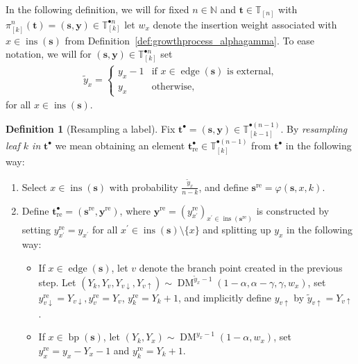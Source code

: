 \documentclass[a4paper, final]{amsart}
\theoremstyle{plain}
\theoremstyle{definition}
\newtheorem{defi}[thm]{Definition}
\newcommand{\tree}[1][t]{\boldsymbol{#1}}
\newcommand{\T}{\mathbb{T}}
\DeclareMathOperator{\edge}{edge}
\DeclareMathOperator{\insertable}{ins}
\DeclareMathOperator{\branchpoints}{bp}
\newcommand{\insertablef}[1][\tree]{\insertable({\tree[#1]})}
\DeclareMathOperator{\dirmult}{DM}
\newcommand{\nin}{{n \in \mathbb{N}}}
\begin{document}
In the following definition, we will for fixed $\nin$ and $\tree \in \T_{[n]}$ with $\pi_{[k]}^n ( \tree ) = (\tree[s], \mathbf{y}) \in \T_{[k]}^{\bullet n}$ let $w_x$ denote the insertion weight associated with $x \in \insertablef[s]$ from Definition~\ref{def:growthprocess_alphagamma}.
To ease notation, we will for $(\tree[s], \mathbf{y}) \in \T_{[k]}^{\bullet n}$ set
%
\begin{align*}
  \tilde{y}_x =
  \begin{cases}
    y_x - 1 & \text{if $x \in \edge(\tree[s])$ is external,} \\
    y_x & \text{otherwise,}
  \end{cases}
\end{align*}
%
for all $x \in \insertablef[s]$.
%
\begin{defi}[Resampling a label]\label{def:resample}
Fix $\tree^\bullet = (\tree[s], \mathbf{y}) \in \T_{[k-1]}^{\bullet (n-1)}$.
  By \textit{resampling leaf $k$ in} $\tree^\bullet$ we mean obtaining an element $\tree_\text{re}^\bullet \in \T_{[k]}^{\bullet (n-1)}$ from $\tree^\bullet$ in the following way:
  \begin{enumerate}[label=\arabic*.]
    \item Select $x \in \insertable \left( \tree[s] \right)$ with probability $\frac{\tilde{y}_x}{n - k}$, and define $\tree[s]^\text{re} = \varphi(\tree[s], x, k)$.
    \item Define $\tree_\text{re}^\bullet = (\tree[s]^\text{re}, \mathbf{y}^\text{re})$, where $\mathbf{y}^\text{re} = {\left( y_{x^\prime}^\text{re} \right)}_{x^\prime \in \insertable ( {\tree[s]}^\text{re})}$ is constructed by setting $y_{x^\prime}^\text{re} = y_{x^\prime}$ for all $x^\prime \in \insertablef[s] \setminus \{x\}$ and splitting up $y_x$ in the following way:
      \begin{itemize}
        \item If $x \in \edge(\tree[s])$, let $v$ denote the branch point created in the previous step.
        Let $\left(Y_{k}, Y_v, Y_{v\downarrow}, Y_{v\uparrow} \right) \sim \dirmult^{\tilde{y}_x - 1}\left(1-\alpha, \alpha-\gamma, \gamma, w_x \right)$, set $y_{v\downarrow}^\text{re} = Y_{v\downarrow}, y_v^\text{re} = Y_v$, $y_k^\text{re} = Y_k + 1$, and implicitly define $y_{v\uparrow}$ by $\tilde{y}_{v\uparrow} = Y_{v\uparrow}$.    
      \item If $x \in \branchpoints(\tree[s])$, let $(Y_{k}, Y_x) \sim \dirmult^{y_x - 1} \left(1-\alpha, w_x \right)$, set $y_x^{\text{re}} = y_x - Y_x - 1$ and $y_k^{\text{re}} = Y_k + 1$.
      \end{itemize}
  \end{enumerate}
\end{defi}
\end{document}
